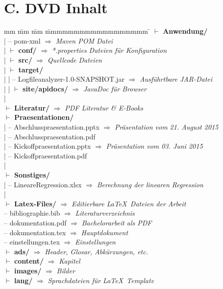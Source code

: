 \section*{C. DVD Inhalt}
\begin{tabbing}
	mm \= mm \= mm \= mmmmmmmmmmmmmmmmmm \= \kill
	$\vdash$ \textbf{Anwendung/} \\ 
	| \> -- pom-xml \> \> \> $\Rightarrow$ \textit{Maven POM Datei} \\
	| \> $\vdash$ \textbf{conf/} \> \> \> $\Rightarrow$ \textit{*.properties Dateien für Konfiguration} \\
	| \> $\vdash$ \textbf{src/} \> \> \> $\Rightarrow$ \textit{Quellcode Dateien} \\
	| \> $\vdash$ \textbf{target/} \\
	| \> | \> -- Logfileanalyzer-1.0-SNAPSHOT.jar \> \> $\Rightarrow$ \textit{Ausführtbare JAR-Datei} \\
	| \> | \> $\vdash$ \textbf{site/apidocs/} \> \> $\Rightarrow$ \textit{JavaDoc für Browser} \\
	| \\
	$\vdash$ \textbf{Literatur/} \> \> \> \> $\Rightarrow$ \textit{PDF Literatur \& E-Books} \\
	$\vdash$ \textbf{Praesentationen/} \\
	| \> -- Abschlusspraesentation.pptx \> \> \> $\Rightarrow$ \textit{Präsentation vom 21. August 2015} \\
	| \> -- Abschlusspraesentation.pdf \\
	| \> -- Kickoffpraesentation.pptx \> \> \> $\Rightarrow$ \textit{Präsentation vom 03. Juni 2015} \\
	| \> -- Kickoffpraesentation.pdf \\
	| \\
	$\vdash$ \textbf{Sonstiges/} \\
	| \> -- LineareRegression.xlsx \> \> \> $\Rightarrow$ \textit{Berechnung der linearen Regression} \\
	| \\
	$\vdash$ \textbf{Latex-Files/} \> \> \> \> $\Rightarrow$ \textit{Editierbare \LaTeX~Dateien der Arbeit}\\ %
	\> -- bibliographie.bib \> \> \> $\Rightarrow$ \textit{Literaturverzeichnis} \\
	\> -- dokumentation.pdf \> \> \> $\Rightarrow$ \textit{Bachelorarbeit als PDF} \\
	\> -- dokumentation.tex \> \> \> $\Rightarrow$ \textit{Hauptdokument} \\
	\> -- einstellungen.tex \> \> \> $\Rightarrow$ \textit{Einstellungen} \\
	\> $\vdash$  \textbf{ads/}   	\> \> \> $\Rightarrow$ \textit{Header, Glosar, Abkürzungen, etc.}\\
	\> $\vdash$  \textbf{content/}  \> \> \> $\Rightarrow$ \textit{Kapitel}\\
	\> $\vdash$  \textbf{images/}   \> \> \> $\Rightarrow$ \textit{Bilder}\\
	\> $\vdash$  \textbf{lang/}  \> \> \> $\Rightarrow$ \textit{Sprachdateien für \LaTeX~Template}\\
	\> 
\end{tabbing}
